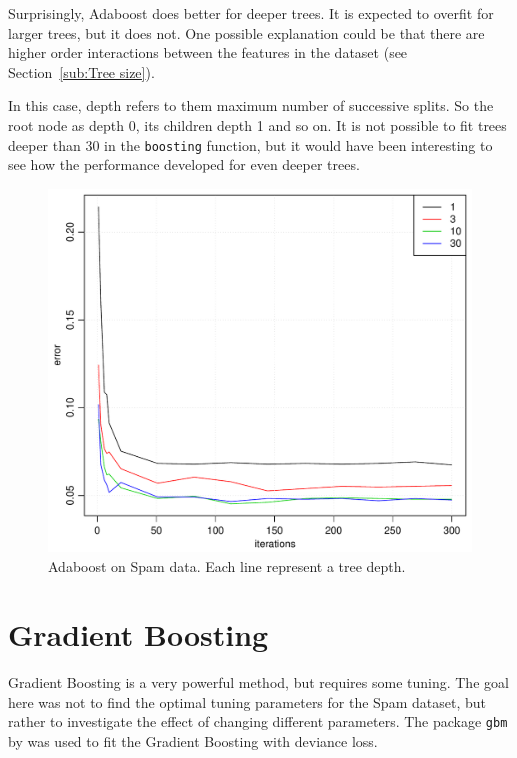 Surprisingly, Adaboost does better for deeper trees. It is expected to overfit for larger trees, but it does not. One possible explanation could be that there are higher order interactions between the features in the dataset (see Section~\ref{sub:Tree size}). 

In this case, depth refers to them maximum number of successive splits. So the root node as depth 0, its children depth 1 and so on.
It is not possible to fit trees deeper than $30$ in the \verb+boosting+ function, but it would have been interesting to see how the performance developed for even deeper trees. 
%
\begin{figure}[htbp]
\begin{center}
    \includegraphics[scale=0.5]{./figures/adaboostSpam.pdf}
\end{center}
\caption{Adaboost on Spam data. Each line represent a tree depth.}
\label{fig:adaboostSpam}
\end{figure}
%
\section{Gradient Boosting}
\label{sec:SimGradBoost}
Gradient Boosting is a very powerful method, but requires some tuning. The goal here was not to find the optimal tuning parameters for the Spam dataset, but rather to investigate the effect of changing different parameters. The package \verb+gbm+ by \cite{gbm} was used to fit the Gradient Boosting with deviance loss.

